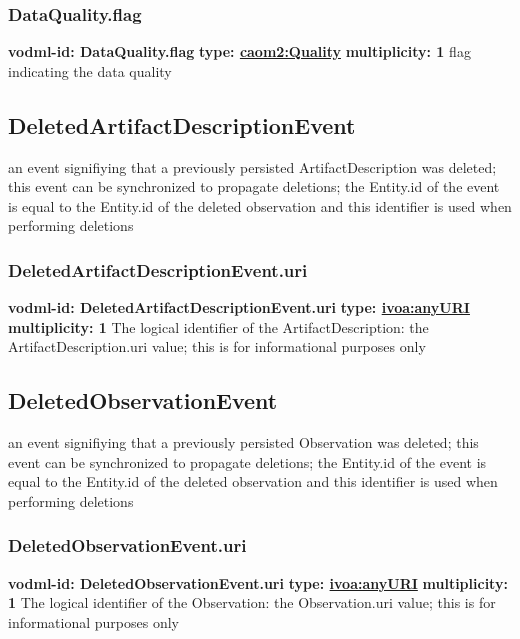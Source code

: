     \subsubsection{DataQuality.flag}
      \textbf{vodml-id: DataQuality.flag} \newline
      \textbf{type: \hyperref[sect:Quality]{caom2:Quality}} \newline
      \textbf{multiplicity: 1} \newline
      flag indicating the data quality

  \subsection{DeletedArtifactDescriptionEvent}
  \label{sect:DeletedArtifactDescriptionEvent}
    an event signifiying that a previously persisted ArtifactDescription was deleted; this event can be synchronized to propagate deletions; the Entity.id of the event is equal to the Entity.id of the deleted observation and this identifier is used when performing deletions

    \subsubsection{DeletedArtifactDescriptionEvent.uri}
      \textbf{vodml-id: DeletedArtifactDescriptionEvent.uri} \newline
      \textbf{type: \hyperref[sect:ivoa]{ivoa:anyURI}} \newline
      \textbf{multiplicity: 1} \newline
      The logical identifier of the ArtifactDescription: the ArtifactDescription.uri value; this is for informational purposes only

  \subsection{DeletedObservationEvent}
  \label{sect:DeletedObservationEvent}
    an event signifiying that a previously persisted Observation was deleted; this event can be synchronized to propagate deletions; the Entity.id of the event is equal to the Entity.id of the deleted observation and this identifier is used when performing deletions

    \subsubsection{DeletedObservationEvent.uri}
      \textbf{vodml-id: DeletedObservationEvent.uri} \newline
      \textbf{type: \hyperref[sect:ivoa]{ivoa:anyURI}} \newline
      \textbf{multiplicity: 1} \newline
      The logical identifier of the Observation: the Observation.uri value; this is for informational purposes only

